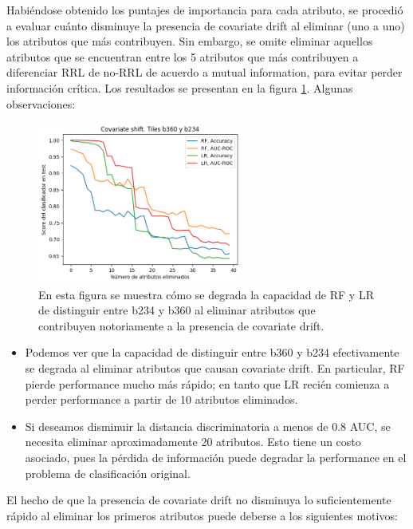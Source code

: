 Habiéndose obtenido los puntajes de importancia para cada atributo, se procedió a evaluar cuánto disminuye la presencia de covariate drift al eliminar (uno a uno) los atributos que más contribuyen. Sin embargo, se omite eliminar aquellos atributos que se encuentran entre los 5 atributos que más contribuyen a diferenciar RRL de no-RRL de acuerdo a mutual information, para evitar perder información crítica. Los resultados se presentan en la figura \ref{fig:reduction_cd}. Algunas observaciones:

\begin{figure}[h!]
\centering
  \includegraphics[width=0.6\textwidth]{Kap8/CS-Reduction-tile1b360tile2b234_single=False.png}  
\caption{En esta figura se muestra cómo se degrada la capacidad de RF y LR de distinguir entre b234 y b360 al eliminar atributos que contribuyen notoriamente a la presencia de covariate drift.}
\label{fig:reduction_cd}
\end{figure}

\begin{itemize}
\item Podemos ver que la capacidad de distinguir entre b360 y b234 efectivamente se degrada al eliminar atributos que causan covariate drift. En particular, RF pierde performance mucho más rápido; en tanto que LR recién comienza a perder performance a partir de 10 atributos eliminados.
\item Si deseamos disminuir la distancia discriminatoria a menos de 0.8 AUC, se necesita eliminar aproximadamente 20 atributos. Esto tiene un costo asociado, pues la pérdida de información puede degradar la performance en el problema de clasificación original.
\end{itemize}

El hecho de que la presencia de covariate drift no disminuya lo suficientemente rápido al eliminar los primeros atributos puede deberse a los siguientes motivos:

